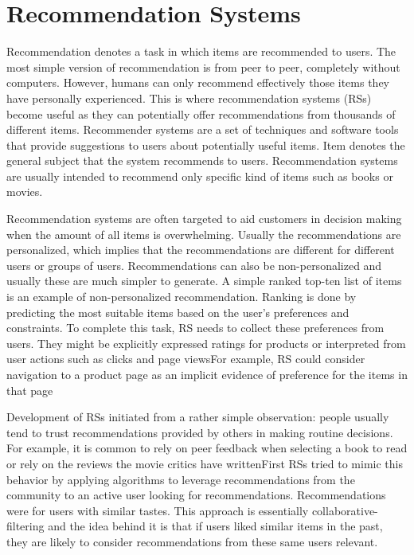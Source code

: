 \documentclass[12pt,a4paper,english
]{tutthesis}
\begin{document}
\chapter{Recommendation Systems}
\label{ch:rs}

Recommendation denotes a task in which items are recommended to users.
The most simple version of recommendation is from peer to peer, completely without computers.
However, humans can only recommend effectively those items they have personally experienced.
This is where recommendation systems (RSs) become useful as they can potentially offer recommendations from thousands of different items.
Recommender systems are a set of techniques and software tools that provide suggestions to users about potentially useful items.
Item denotes the general subject that the system recommends to users.
Recommendation systems are usually intended to recommend only specific kind of items such as books or movies. \cite{ricci11}

Recommendation systems are often targeted to aid customers in decision making when the amount of all items is overwhelming.
Usually the recommendations are personalized, which implies that the recommendations are different for different users or groups of users.
Recommendations can also be non-personalized and usually these are much simpler to generate.
A simple ranked top-ten list of items is an example of non-personalized recommendation.
Ranking is done by predicting the most suitable items based on the user's preferences and constraints.
To complete this task, RS needs to collect these preferences from users.
They might be explicitly expressed ratings for products or interpreted from user actions such as clicks and page viewsFor example, RS could consider navigation to a product page as an implicit evidence of preference for the items in that page\cite{ricci11}

Development of RSs initiated from a rather simple observation: people usually tend to trust recommendations provided by others in making routine decisions.
For example, it is common to rely on peer feedback when selecting a book to read or rely on the reviews the movie critics have writtenFirst RSs tried to mimic this behavior by applying algorithms to leverage recommendations from the community to an active user looking for recommendations. Recommendations were for users with similar tastes. This approach is essentially collaborative-filtering and the idea behind it is that if users liked similar items in the past, they are likely to consider recommendations from these same users relevant. \cite{ricci11}
\end{document}
